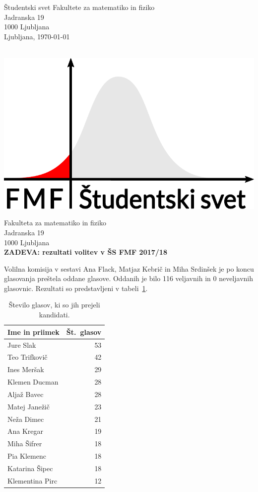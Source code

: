 \documentclass[a4paper,oneside,12pt]{article}
\begin{document}
\begin{minipage}[t]{0.7\linewidth}
Študentski svet Fakultete za matematiko in fiziko \\
Jadranska 19 \\
1000 Ljubljana \\

Ljubljana, \today\\
\end{minipage}%
\begin{minipage}[t]{0.3\linewidth}
  \mbox{} \\[-15pt]
  \hspace*{\fill} \includegraphics[width=0.9\linewidth]{ssfmf_logo_col.pdf}
\end{minipage}

Fakulteta za matematiko in fiziko \\
Jadranska 19 \\
1000 Ljubljana \\

\textbf{ZADEVA: rezultati volitev v ŠS FMF 2017/18}

Volilna komisija v sestavi Ana Flack, Matjaz Kebrič in Miha Srdinšek je po koncu glasovanja preštela oddane
glasove. Oddanih je bilo 116 veljavnih in 0 neveljavnih
glasovnic. Rezultati so predstavljeni v tabeli~\ref{tab:rez}.

\begin{table}[!h]
    \centering
    \begin{tabular}{|l|r|} \hline
\textbf{Ime	in priimek} & \textbf{Št.\ glasov} \\ \hline
Jure Slak & 53 \\ \hline
Teo Trifkovič & 42 \\ \hline
Ines Meršak & 29 \\ \hline
Klemen Ducman & 28 \\ \hline
Aljaž Bavec & 28 \\ \hline
Matej Janežič & 23 \\ \hline
Neža Dimec & 21 \\ \hline
Ana Kregar & 19 \\ \hline
Miha Šifrer & 18 \\ \hline
Pia Klemenc & 18 \\ \hline
Katarina Šipec & 18 \\ \hline
Klementina Pirc & 12 \\ \hline
    \end{tabular}
    \caption{Število glasov, ki so jih prejeli kandidati.}
    \label{tab:rez}
\end{table}
\end{document}
